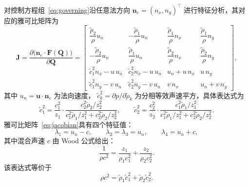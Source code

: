 \documentclass[12pt,a4paper]{article}
\newtheorem{remark}[theorem]{注}
\numberwithin{equation}{section}    %
\begin{document}

对控制方程组~\eqref{eq:governing}沿任意法方向 $\bm{n}_e = (n_x, n_y)^\top$
进行特征分析，其对应的雅可比矩阵为~\cite{zhang2023physical}
\begin{equation}
    \label{eq:jacobian}
    \bm{J}
    = \frac{\partial \bigl(\bm{n}_e \cdot \bm{F}(\bm{Q})\bigr)}{\partial \bm{Q}}
    =
    \begin{bmatrix}
        \dfrac{\tilde{\rho}_2}{\rho} u_n
         & -\dfrac{\tilde{\rho}_1}{\rho} u_n
         &  \dfrac{\tilde{\rho}_1}{\rho} n_x
         &  \dfrac{\tilde{\rho}_1}{\rho} n_y \\[3mm]
        -\dfrac{\tilde{\rho}_2}{\rho} u_n
         &  \dfrac{\tilde{\rho}_1}{\rho} u_n
         &  \dfrac{\tilde{\rho}_2}{\rho} n_x
         &  \dfrac{\tilde{\rho}_2}{\rho} n_y \\[3mm]
        \tilde{c}_1^2 n_x - u\, u_n
         & \tilde{c}_2^2 n_x - u\, u_n
         & u_n + u\, n_x
         & u\, n_y \\[3mm]
        \tilde{c}_1^2 n_y - v\, u_n
         & \tilde{c}_2^2 n_y - v\, u_n
         & v\, n_x
         & u_n + v\, n_y
    \end{bmatrix},
\end{equation}
其中 $u_n = \bm{u} \cdot \bm{n}_e$ 为法向速度，
$\tilde{c}_k^2 = \partial p / \partial \tilde{\rho}_k$
为分相等效声速平方，具体表达式为
\begin{equation}
    \label{eq:phase_sound_speed}
    \tilde{c}_1^2
    = \frac{c_1^2}{z_1}
    \cdot\frac{c_2^2 \tilde{\rho}_2 / z_2^2}
    {c_1^2 \tilde{\rho}_1 / z_1^2 + c_2^2 \tilde{\rho}_2 / z_2^2},
    \qquad
    \tilde{c}_2^2
    = \frac{c_2^2}{z_2}
    \cdot\frac{c_1^2 \tilde{\rho}_1 / z_1^2}
    {c_1^2 \tilde{\rho}_1 / z_1^2 + c_2^2 \tilde{\rho}_2 / z_2^2}.
\end{equation}
雅可比矩阵~\eqref{eq:jacobian}具有四个特征值：
\begin{equation}
    \label{eq:eigenvalues}
    \lambda_1 = u_n - c,
    \qquad
    \lambda_2 = \lambda_3 = u_n,
    \qquad
    \lambda_4 = u_n + c,
\end{equation}
其中混合声速 $c$ 由 Wood 公式给出：
\begin{equation}
    \label{eq:wood2}
    \frac{1}{\rho c^2}
    = \frac{z_1}{\rho_1 c_1^2} + \frac{z_2}{\rho_2 c_2^2}.
\end{equation}
该表达式等价于
\begin{equation}
    \label{eq:wood_tilde}
    \rho c^2 = \tilde{\rho}_1 \tilde{c}_1^2 + \tilde{\rho}_2 \tilde{c}_2^2.
\end{equation}
\end{document}
